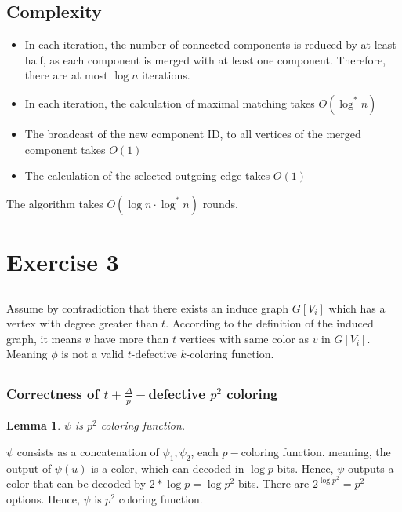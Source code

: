 \documentclass[11pt]{article}
\newtheorem{lemma}[theorem]{Lemma}
\begin{document}
\subsection*{Complexity}
\begin{itemize}
    \item In each iteration, the number of connected components is reduced by at least half, as each component is merged with at least one component. Therefore, there are at most $\log{n}$ iterations.
    \item In each iteration, the calculation of maximal matching takes $O(\log^{*}{n})$
    \item The broadcast of the new component ID, to all vertices of the merged component takes $O(1)$
    \item The calculation of the selected outgoing edge takes $O(1)$
\end{itemize}
The algorithm takes $O(\log{n} \cdot \log^{*}{n})$ rounds.

\section{Exercise 3}

\subsection{}
Assume by contradiction that there exists an induce graph $G[V_i]$ which has a vertex with degree greater than $t$. According to the definition of the induced graph, it means $v$ have more than $t$ vertices with same color as $v$ in $G[V_i]$. Meaning $\phi$ is not a valid $t$-defective $k$-coloring function.

\subsection{}

\subsubsection*{Correctness of $t + \frac{\Delta}{p}-$defective $p^2$ coloring}

\begin{lemma}
\label{psi_p2_coloring}
$\psi$ is $p^2$ coloring function.
\end{lemma}
$\psi$ consists as a concatenation of $\psi_1, \psi_2$, each $p-$coloring function. meaning, the output of $\psi(u)$ is a color, which can decoded in $\log{p}$ bits. Hence, $\psi$ outputs a color that can be decoded by $2*\log{p}=\log{p^2}$ bits. There are $2^{\log{p^2}}=p^2$ options. Hence, $\psi$ is $p^2$ coloring function. 
\end{document}
